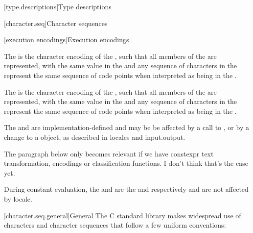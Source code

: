 \documentclass{wg21}
\begin{document}
[type.descriptions]{Type descriptions}

[character.seq]{Character sequences}


\begin{addedblock}
[execution encodings]{Execution encodings}

The  is the character encoding of the , such that
all members of the  are represented, with the same value in the  and any sequence of characters
in the  represent the same sequence of code points when interpreted as being in the .

The  is the character encoding of the , such that
all members of the  are represented, with the same value in the  and any sequence of characters
in the  represent the same sequence of code points when interpreted as being in the .

The  and  are implementation-defined and may be be affected by a call to , or by a change to a  object, as described in locales and input.output.

\end{addedblock}

\begin{quoteblock}
The paragraph below only becomes relevant if we have constexpr text transformation, encodings or classification functions.
I don't think that's the case yet.
\end{quoteblock}

\begin{addedblock}
During constant evaluation, the  and  are the  and  respectively and are not affected by locale.

\end{addedblock}

[character.seq.general]{General}
\pnum
The C standard library makes widespread use
%
of characters and character sequences that follow a few uniform conventions:
\end{document}
